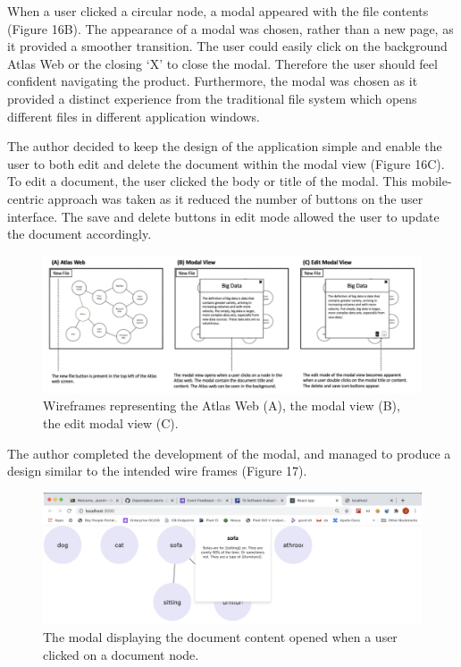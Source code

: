 \documentclass{article}
\begin{document}
When a user clicked a circular node, a modal appeared with the file contents (Figure 16B). The appearance of a modal was chosen, rather than a new page, as it provided a smoother transition. The user could easily click on the background Atlas Web or the closing ‘X’ to close the modal. Therefore the user should feel confident navigating the product. Furthermore, the modal was chosen as it provided a distinct experience from the traditional file system which opens different files in different application windows.

The author decided to keep the design of the application simple and enable the user to both edit and delete the document within the modal view (Figure 16C). To edit a document, the user clicked the body or title of the modal. This mobile-centric approach was taken as it reduced the number of buttons on the user interface. The save and delete buttons in edit mode allowed the user to update the document accordingly.

\begin{figure}[!htb]
  \centering
      \includegraphics[width=1\textwidth]{images/modal.png}
  \caption{Wireframes representing the Atlas Web (A), the modal view (B), the edit modal view (C).}
\end{figure}

The author completed the development of the modal, and managed to produce a design similar to the intended wire frames (Figure 17).

\begin{figure}[!htb]
  \centering
      \includegraphics[width=1\textwidth]{images/modal-screenshot.png}
  \caption{The modal displaying the document content opened when a user clicked on a document node.}
\end{figure}
\end{document}
